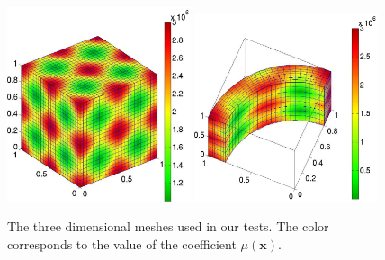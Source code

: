 \documentclass[smallcondensed,final]{svjour3}     %
\newcommand{\bs}[1]{\ensuremath{\boldsymbol #1}}
\begin{document}
\begin{figure}
	\includegraphics[width=0.48\textwidth]{figs/box3a}
	\includegraphics[width=0.48\textwidth]{figs/fan3a}
	\caption{\label{fig:mesh3d} The three dimensional meshes used
          in our tests. The color corresponds to the value of the
          coefficient $\mu(\bs x)$.}
\end{figure}
\end{document}
